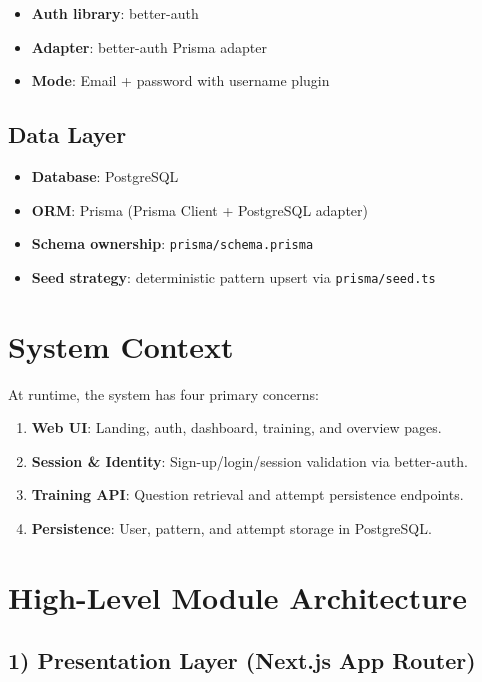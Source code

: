 \documentclass[11pt]{article}
\begin{document}
\begin{itemize}[leftmargin=*]
	\item \textbf{Auth library}: better-auth
	\item \textbf{Adapter}: better-auth Prisma adapter
	\item \textbf{Mode}: Email + password with username plugin
\end{itemize}

\subsection*{Data Layer}

\begin{itemize}[leftmargin=*]
	\item \textbf{Database}: PostgreSQL
	\item \textbf{ORM}: Prisma (Prisma Client + PostgreSQL adapter)
	\item \textbf{Schema ownership}: \texttt{prisma/schema.prisma}
	\item \textbf{Seed strategy}: deterministic pattern upsert via \texttt{prisma/seed.ts}
\end{itemize}

\section{System Context}

At runtime, the system has four primary concerns:

\begin{enumerate}[leftmargin=*]
	\item \textbf{Web UI}: Landing, auth, dashboard, training, and overview pages.
	\item \textbf{Session \& Identity}: Sign-up/login/session validation via better-auth.
	\item \textbf{Training API}: Question retrieval and attempt persistence endpoints.
	\item \textbf{Persistence}: User, pattern, and attempt storage in PostgreSQL.
\end{enumerate}

\section{High-Level Module Architecture}

\subsection*{1) Presentation Layer (Next.js App Router)}
\end{document}
